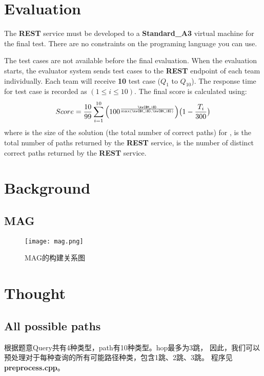 \documentclass[hyperref,UTF8]{ctexart}
\theoremstyle{definition}
\theoremstyle{remark}
\numberwithin{equation}{subsection}
\newcommand{\Emph}{\textbf}
\begin{document}
\section{Evaluation}
\label{sec:evaluation}

	The \Emph{REST} service must be developed to a \Emph{Standard\_A3} virtual machine for the final test.
	There are no constraints on the programing 	language you can use.
	
	The test cases are not  available before the final evaluation.
	When the evaluation starts, the evaluator system sends test cases
	to the \Emph{REST} endpoint of each team individually.
	Each team will receive \Emph{10} test case ($Q_1$ to $Q_{10}$).
	The response time for test case  is recorded as $(1 \le i \le 10)$.
	The final score is calculated using:
	\[
		Score = \frac{10}{99} \sum_{i=1}^{10} \Big( 100^{\frac{\kw{$M_i$}}{\max(\kw{$K_i$}, \kw{$N_i$})}} \Big) \big( 1 - \frac{T_i}{300} \big)
	\]
	where  is the size of the solution (the total number of correct paths) for ,
	 is the total number of paths returned by the \Emph{REST} service,
	 is the number of distinct correct paths returned by the \Emph{REST} service.
	
\section{Background}
\label{sec:Background}

\subsection{MAG}

	\begin{figure}[H]
	\centering
	\texttt{[image: mag.png]}
    \caption{MAG的构建关系图}
	\end{figure}
	
\section{Thought}	
\label{sec:thought}

\subsection{All possible paths}

	根据题意Query共有4种类型，path有10种类型。hop最多为3跳，
	因此，我们可以预处理对于每种查询的所有可能路径种类，包含1跳、2跳、3跳。
	程序见\Emph{preprocess.cpp}。
	
\end{document}
